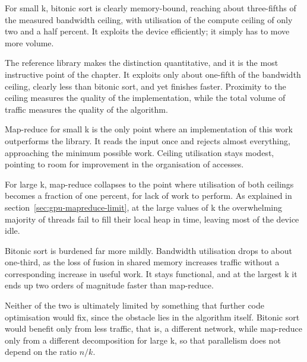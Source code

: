 For small k, bitonic sort is clearly memory-bound, reaching about three-fifths
of the measured bandwidth ceiling, with utilisation of the compute ceiling of
only two and a half percent. It exploits the device efficiently; it simply has
to move more volume.

The reference library makes the distinction quantitative, and it is the most
instructive point of the chapter. It exploits only about one-fifth of the
bandwidth ceiling, clearly less than bitonic sort, and yet finishes faster.
Proximity to the ceiling measures the quality of the implementation, while the
total volume of traffic measures the quality of the algorithm.

Map-reduce for small k is the only point where an implementation of this work
outperforms the library. It reads the input once and rejects almost everything,
approaching the minimum possible work. Ceiling utilisation stays modest,
pointing to room for improvement in the organisation of accesses.

For large k, map-reduce collapses to the point where utilisation of both
ceilings becomes a fraction of one percent, for lack of work to perform. As
explained in section~\ref{sec:gpu-mapreduce-limit}, at the large values of k
the overwhelming majority of threads fail to fill their local heap in time,
leaving most of the device idle.

Bitonic sort is burdened far more mildly. Bandwidth utilisation drops to about
one-third, as the loss of fusion in shared memory increases traffic without a
corresponding increase in useful work. It stays functional, and at the largest
k it ends up two orders of magnitude faster than map-reduce.

Neither of the two is ultimately limited by something that further code
optimisation would fix, since the obstacle lies in the algorithm itself.
Bitonic sort would benefit only from less traffic, that is, a different
network, while map-reduce only from a different decomposition for large k, so
that parallelism does not depend on the ratio $n/k$.
